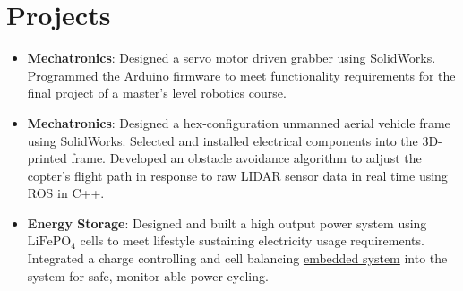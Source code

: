 \documentclass[letterpaper,11pt]{article}
\newcommand{\resumeItem}[2]{
  \item\small{
    \textbf{#1}{: #2 \vspace{-2pt}}
  }
}
\newcommand{\resumeSubItem}[2]{\resumeItem{#1}{#2}\vspace{-4pt}}
\newcommand{\resumeSubHeadingListStart}{\begin{itemize}[leftmargin=*]}
\newcommand{\resumeSubHeadingListEnd}{\end{itemize}}
\begin{document}
\section{Projects}
  \resumeSubHeadingListStart
  \resumeSubItem{Mechatronics}
      {Designed a servo motor driven grabber using SolidWorks. Programmed the Arduino firmware to meet functionality requirements for the final project of a master's level robotics course.}
    \resumeSubItem{Mechatronics}
      {Designed a hex-configuration unmanned aerial vehicle frame using SolidWorks. Selected and installed electrical components into the 3D-printed frame. Developed an obstacle avoidance algorithm to adjust the copter's flight path in response to raw LIDAR sensor data in real time using ROS in C++.}
    \resumeSubItem{Energy Storage}
      {Designed and built a high output power system using $\text{LiFePO}_{\text{4}}$ cells to meet lifestyle sustaining electricity usage requirements. Integrated a charge controlling and cell balancing {\href{https://electrodacus.com/}{embedded system}} into the system for safe, monitor-able power cycling.}
  \resumeSubHeadingListEnd
\end{document}
